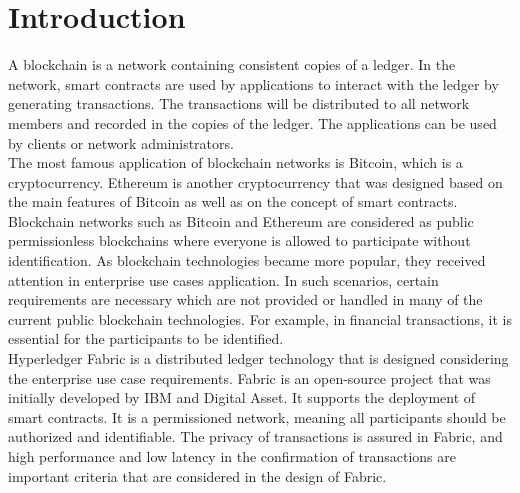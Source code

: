 \documentclass[sigconf,natbib=false]{acmart}
\begin{document}


    \maketitle

    \section{Introduction}
    A blockchain is a network containing consistent copies of a ledger. In the network, smart contracts are used by applications to interact with the ledger by generating transactions. The transactions will be distributed to all network members and recorded in the copies of the ledger. The applications can be used by clients or network administrators.\cite{hyperledgerIntroduction}\\
    The most famous application of blockchain networks is Bitcoin, which is a cryptocurrency. Ethereum is another cryptocurrency that was designed based on the main features of Bitcoin as well as on the concept of smart contracts. Blockchain networks such as Bitcoin and Ethereum are considered as public permissionless blockchains where everyone is allowed to participate without identification.
    As blockchain technologies became more popular, they received attention in enterprise use cases application. In such scenarios, certain requirements are necessary which are not provided or handled in many of the current public blockchain technologies. For example, in financial transactions, it is essential for the participants to be identified.\cite{hyperledgerIntroduction}\\
    Hyperledger Fabric is a distributed ledger technology that is designed considering the enterprise use case requirements. Fabric is an open-source project that was initially developed by IBM and Digital Asset. It supports the deployment of smart contracts. It is a permissioned network, meaning all participants should be authorized and identifiable. The privacy of transactions is assured in Fabric, and high performance and low latency in the confirmation of transactions are important criteria that are considered in the design of Fabric.\cite{hyperledgerIntroduction}
\end{document}
